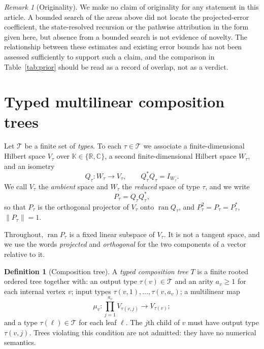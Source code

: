 \documentclass[11pt]{amsart}
\theoremstyle{definition}
\newtheorem{definition}[theorem]{Definition}
\theoremstyle{remark}
\newtheorem{remark}[theorem]{Remark}
\newcommand{\ran}{\operatorname{ran}}
\newcommand{\Types}{\mathcal T}
\newcommand{\norm}[1]{\lVert#1\rVert}
\begin{document}
\begin{remark}[Originality]
\label{rem:originality}
We make no claim of originality for any statement in this article. A bounded search of
the areas above did not locate the projected-error coefficient, the state-resolved
recursion or the pathwise attribution in the form given here, but absence from a bounded
search is not evidence of novelty. The relationship between these estimates and existing
error bounds has not been assessed sufficiently to support such a claim, and the
comparison in Table~\ref{tab:prior} should be read as a record of overlap, not as a
verdict.
\end{remark}

\begin{table}[p]
\centering\scriptsize
\caption{Overlap with the cited literature, by area. A bounded search cannot establish
originality; see Remark~\ref{rem:originality}.}
\label{tab:prior}
\resizebox{\textwidth}{!}{}
\end{table}

\section{Typed multilinear composition trees}
\label{sec:setting}

Let $\Types$ be a finite set of \emph{types}. To each $\tau\in\Types$ we associate a
finite-dimensional Hilbert space $V_\tau$ over $\mathbb K\in\{\mathbb R,\mathbb C\}$, a
second finite-dimensional Hilbert space $W_\tau$, and an isometry
\[
 Q_\tau:W_\tau\longrightarrow V_\tau,
 \qquad
 Q_\tau^*Q_\tau=I_{W_\tau}.
\]
We call $V_\tau$ the \emph{ambient} space and $W_\tau$ the \emph{reduced} space of type
$\tau$, and we write
\[
 P_\tau=Q_\tau Q_\tau^*,
\]
so that $P_\tau$ is the orthogonal projector of $V_\tau$ onto $\ran Q_\tau$, and
$P_\tau^2=P_\tau=P_\tau^*$, $\norm{P_\tau}=1$.

Throughout, $\ran P_\tau$ is a fixed linear subspace of $V_\tau$. It is not a tangent
space, and we use the words \emph{projected} and \emph{orthogonal} for the two components
of a vector relative to it.

\begin{definition}[Composition tree]
\label{def:tree}
A \emph{typed composition tree} $T$ is a finite rooted ordered tree together with:
an output type $\tau(v)\in\Types$ and an arity $a_v\ge1$ for each internal vertex $v$;
input types $\tau(v,1),\ldots,\tau(v,a_v)$; a multilinear map
\[
 \mu_v:\prod_{j=1}^{a_v}V_{\tau(v,j)}\longrightarrow V_{\tau(v)};
\]
and a type $\tau(\ell)\in\Types$ for each leaf $\ell$. The $j$th child of $v$ must have
output type $\tau(v,j)$. Trees violating this condition are not admitted: they have no
numerical semantics.
\end{definition}
\end{document}

